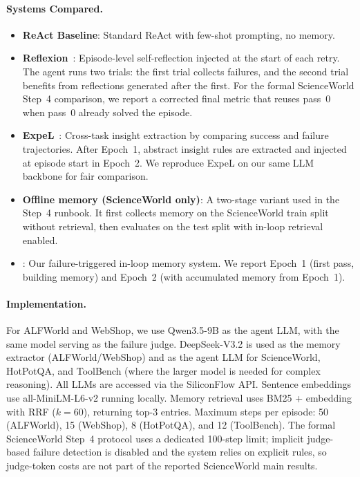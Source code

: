 \paragraph{Systems Compared.}
\begin{itemize}
    \item \textbf{ReAct Baseline}: Standard ReAct with few-shot prompting, no memory.
    \item \textbf{Reflexion}~\citep{shinn2023reflexion}: Episode-level self-reflection injected at the start of each retry. The agent runs two trials: the first trial collects failures, and the second trial benefits from reflections generated after the first. For the formal ScienceWorld Step~4 comparison, we report a corrected final metric that reuses pass~0 when pass~0 already solved the episode.
    \item \textbf{ExpeL}~\citep{zhao2024expel}: Cross-task insight extraction by comparing success and failure trajectories. After Epoch~1, abstract insight rules are extracted and injected at episode start in Epoch~2. We reproduce ExpeL on our same LLM backbone for fair comparison.
    \item \textbf{Offline memory (ScienceWorld only)}: A two-stage variant used in the Step~4 runbook. It first collects memory on the ScienceWorld train split without retrieval, then evaluates on the test split with in-loop retrieval enabled.
    \item \textbf{\method{}}: Our failure-triggered in-loop memory system. We report Epoch~1 (first pass, building memory) and Epoch~2 (with accumulated memory from Epoch~1).
\end{itemize}

\paragraph{Implementation.} For ALFWorld and WebShop, we use Qwen3.5-9B as the agent LLM, with the same model serving as the failure judge. DeepSeek-V3.2 is used as the memory extractor (ALFWorld/WebShop) and as the agent LLM for ScienceWorld, HotPotQA, and ToolBench (where the larger model is needed for complex reasoning). All LLMs are accessed via the SiliconFlow API. Sentence embeddings use all-MiniLM-L6-v2 running locally. Memory retrieval uses BM25 + embedding with RRF ($k=60$), returning top-3 entries. Maximum steps per episode: 50 (ALFWorld), 15 (WebShop), 8 (HotPotQA), and 12 (ToolBench). The formal ScienceWorld Step~4 protocol uses a dedicated 100-step limit; implicit judge-based failure detection is disabled and the system relies on explicit rules, so judge-token costs are not part of the reported ScienceWorld main results.

